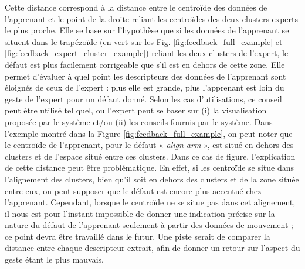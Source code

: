 Cette distance correspond à la distance entre le centroïde des données de l'apprenant et le point de la droite reliant les centroïdes des deux clusters experts le plus proche. Elle se base sur l'hypothèse que si les données de l'apprenant se situent dans le trapézoïde (en vert sur les Fig. \ref{fig:feedback_full_example} et  \ref{fig:feedback_expert_cluster_example}) reliant les deux clusters de l'expert, le défaut est plus facilement corrigeable que s'il est en dehors de cette zone. Elle permet d'évaluer à quel point les descripteurs des données de l'apprenant sont éloignés de ceux de l'expert : plus elle est grande, plus l'apprenant est loin du geste de l'expert pour un défaut donné. Selon les cas d'utilisations, ce conseil peut être utilisé tel quel, ou l'expert peut se baser sur (i) la visualisation proposée par le système et/ou (ii) les conseils fournis par le système. Dans l'exemple montré dans la Figure \ref{fig:feedback_full_example}, on peut noter que le centroïde de l'apprenant, pour le défaut « \textit{align arm} », est situé en dehors des clusters et de l'espace situé entre ces clusters. Dans ce cas de figure, l'explication de cette distance peut être problématique. En effet, si les centroïde se situe dans l'alignement des clusters, bien qu'il soit en dehors des clusters et de la zone située entre eux, on peut supposer que le défaut est encore plus accentué chez l'apprenant. Cependant, lorsque le centroïde ne se situe pas dans cet alignement, il nous est pour l'instant impossible de donner une indication précise sur la nature du défaut de l'apprenant seulement à partir des données de mouvement ; ce point devra être travaillé dans le futur. Une piste serait de comparer la distance entre chaque descripteur extrait, afin de donner un retour sur l'aspect du geste étant le plus mauvais.

